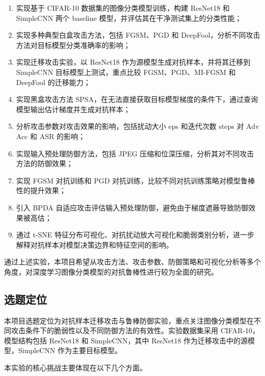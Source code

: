 \documentclass[UTF8,a4paper,12pt]{ctexart}
\begin{document}
\begin{enumerate}
    \item 实现基于 CIFAR-10 数据集的图像分类模型训练，构建 ResNet18 和 SimpleCNN 两个 baseline 模型，并评估其在干净测试集上的分类性能；
    
    \item 实现多种典型白盒攻击方法，包括 FGSM、PGD 和 DeepFool，分析不同攻击方法对目标模型分类准确率的影响；
    
    \item 实现迁移攻击实验，以 ResNet18 作为源模型生成对抗样本，并将其迁移到 SimpleCNN 目标模型上测试，重点比较 FGSM、PGD、MI-FGSM 和 DeepFool 的迁移能力；
    
    \item 实现黑盒攻击方法 SPSA，在无法直接获取目标模型梯度的条件下，通过查询模型输出估计梯度并生成对抗样本；
    
    \item 分析攻击参数对攻击效果的影响，包括扰动大小 eps 和迭代次数 steps 对 Adv Acc 和 ASR 的影响；
    
    \item 实现输入预处理防御方法，包括 JPEG 压缩和位深压缩，分析其对不同攻击方法的防御效果；
    
    \item 实现 FGSM 对抗训练和 PGD 对抗训练，比较不同对抗训练策略对模型鲁棒性的提升效果；
    
    \item 引入 BPDA 自适应攻击评估输入预处理防御，避免由于梯度遮蔽导致防御效果被高估；
    
    \item 通过 t-SNE 特征分布可视化、对抗扰动放大可视化和脆弱类别分析，进一步解释对抗样本对模型决策边界和特征空间的影响。
\end{enumerate}

通过上述实验，本项目希望从攻击方法、攻击参数、防御策略和可视化分析等多个角度，对深度学习图像分类模型的对抗鲁棒性进行较为全面的研究。

\subsection{选题定位}

本项目选题定位为对抗样本迁移攻击与鲁棒防御实验，重点关注图像分类模型在不同攻击条件下的脆弱性以及不同防御方法的有效性。实验数据集采用 CIFAR-10，模型结构包括 ResNet18 和 SimpleCNN，其中 ResNet18 作为迁移攻击中的源模型，SimpleCNN 作为主要目标模型。

本实验的核心挑战主要体现在以下几个方面。
\end{document}
